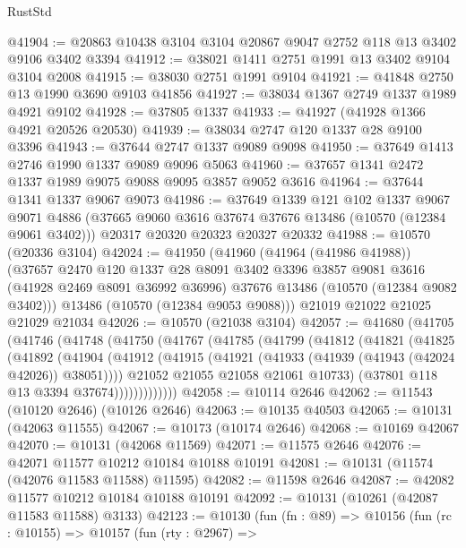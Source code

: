\begin{lexlean}{RustStd}
\begin{coremodule}
@41904 := @20863 @10438 @3104 @3104 @20867 @9047 @2752 @118 @13 @3402 @9106 @3402 @3394
@41912 := @38021 @1411 @2751 @1991 @13 @3402 @9104 @3104 @2008
@41915 := @38030 @2751 @1991 @9104
@41921 := @41848 @2750 @13 @1990 @3690 @9103 @41856
@41927 := @38034 @1367 @2749 @1337 @1989 @4921 @9102
@41928 := @37805 @1337
@41933 := @41927 (@41928 @1366 @4921 @20526 @20530)
@41939 := @38034 @2747 @120 @1337 @28 @9100 @3396
@41943 := @37644 @2747 @1337 @9089 @9098
@41950 := @37649 @1413 @2746 @1990 @1337 @9089 @9096 @5063
@41960 := @37657 @1341 @2472 @1337 @1989 @9075 @9088 @9095 @3857 @9052 @3616
@41964 := @37644 @1341 @1337 @9067 @9073
@41986 := @37649
    @1339
    @121
    @102
    @1337
    @9067
    @9071
    @4886
    (@37665 @9060 @3616 @37674 @37676 @13486 (@10570 (@12384 @9061 @3402)))
    @20317
    @20320
    @20323
    @20327
    @20332
@41988 := @10570 (@20336 @3104)
@42024 := @41950
    (@41960
      (@41964 (@41986 @41988))
      (@37657
        @2470
        @120
        @1337
        @28
        @8091
        @3402
        @3396
        @3857
        @9081
        @3616
        (@41928 @2469 @8091 @36992 @36996)
        @37676
        @13486
        (@10570 (@12384 @9082 @3402)))
      @13486
      (@10570 (@12384 @9053 @9088)))
    @21019
    @21022
    @21025
    @21029
    @21034
@42026 := @10570 (@21038 @3104)
@42057 := @41680
    (@41705
      (@41746
        (@41748
          (@41750
            (@41767
              (@41785
                (@41799
                  (@41812
                    (@41821
                      (@41825
                        (@41892
                          (@41904
                            (@41912
                              (@41915 (@41921 (@41933 (@41939 (@41943 (@42024 @42026)) @38051))))
                              @21052
                              @21055
                              @21058
                              @21061
                              @10733)
                            (@37801 @118 @13 @3394 @37674)))))))))))))
@42058 := @10114 @2646
@42062 := @11543 (@10120 @2646) (@10126 @2646)
@42063 := @10135 @40503
@42065 := @10131 (@42063 @11555)
@42067 := @10173 (@10174 @2646)
@42068 := @10169 @42067
@42070 := @10131 (@42068 @11569)
@42071 := @11575 @2646
@42076 := @42071 @11577 @10212 @10184 @10188 @10191
@42081 := @10131 (@11574 (@42076 @11583 @11588) @11595)
@42082 := @11598 @2646
@42087 := @42082 @11577 @10212 @10184 @10188 @10191
@42092 := @10131 (@10261 (@42087 @11583 @11588) @3133)
@42123 := @10130
    (fun (fn : @89) =>
    @10156
      (fun (rc : @10155) =>
      @10157
        (fun (rty : @2967) =>

\end{coremodule}
\end{lexlean}
